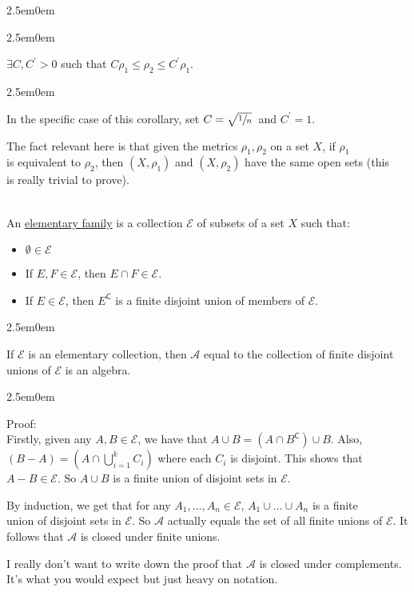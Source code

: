 \documentclass{book}
\newcommand{\hTwo}{%
\color{MidnightBlue}%
   \fontsize{13}{15}\selectfont%
}
\newcommand{\hThree}{%
   \color{PineGreen!85!Orange}
   \fontsize{12}{14}\selectfont%
}
\newcommand{\hFour}{%
   \color{Cyan}
   \fontsize{12}{14}\selectfont%
}
\newenvironment{myIndent}{%
   \begin{adjustwidth}{2.5em}{0em}%
}{%
   \end{adjustwidth}%
}
\newcommand{\udefine}[1]{{%
   \setulcolor{Red}%
   \setul{0.14em}{0.07em}%
   \ul{#1}%
}}
\newcommand{\comp}{\mathsf{C}}
\newcommand{\myHS}{ \hspace{0.5em}}
\newcommand{\mySepTwo}[1][.]{%
   {\noindent\color{#1}{\rule{6.5in}{0.5mm}}}\\%
}
\newcommand{\retTwo}{\hfill\bigbreak}
\begin{document}
\begin{myIndent}
\begin{myIndent}
      {\centering $\exists C, C^\prime > 0$ such that $C\rho_1 \leq \rho_2 \leq C^\prime\rho_1$.\retTwo\par}

      
      \begin{myIndent}\hFour
         In the specific case of this corollary, set $C = \sqrt{\sfrac{1}{n}}\hspace{0.2em}$ and $C^\prime = 1$.\retTwo
      \end{myIndent}

      The fact relevant here is that given the metrics $\rho_1, \rho_2$ on a set $X$, if $\rho_1$\\ is equivalent to $\rho_2$, then $(X, \rho_1)$ and $(X, \rho_2)$ have the same open sets (this\\ is really trivial to prove).\retTwo
   \end{myIndent}
\end{myIndent}

\mySepTwo

An \udefine{elementary family} is a collection $\mathcal{E}$ of subsets of a set $X$ such that:

\begin{itemize}
   \item $\emptyset \in \mathcal{E}$
   \item If $E, F \in \mathcal{E}$, then $E \cap F \in \mathcal{E}$.
   \item If $E \in \mathcal{E}$, then $E^\comp$ is a finite disjoint union of members of $\mathcal{E}$.
\end{itemize}

\newpage

\begin{myIndent}\hTwo
   If $\mathcal{E}$ is an elementary collection, then $\mathcal{A}$ equal to the collection of finite disjoint\\ unions of $\mathcal{E}$ is an algebra.\retTwo

   \begin{myIndent}\hThree
      Proof:\\
      Firstly, given any $A, B \in \mathcal{E}$, we have that $A \cup B = (A \cap B^\comp) \cup B$. Also,\\ $(B - A) = (A \cap \bigcup\limits_{i=1}^k C_i)$ where each $C_i$ is disjoint. This shows that $A - B \in \mathcal{E}$. So $A \cup B$ is a finite union of disjoint sets in $\mathcal{E}$.  \retTwo

      By induction, we get that for any $A_1, \ldots, A_n \in \mathcal{E}$,\myHS $A_1 \cup \ldots \cup A_n$ is a finite\\ union of disjoint sets in $\mathcal{E}$. So $\mathcal{A}$ actually equals the set of all finite unions of $\mathcal{E}$. It\\ follows that $\mathcal{A}$ is closed under finite unions.\retTwo

      I really don't want to write down the proof that $\mathcal{A}$ is closed under complements. It's what you would expect but just heavy on notation.
   \end{myIndent}
\end{myIndent}
\end{document}
